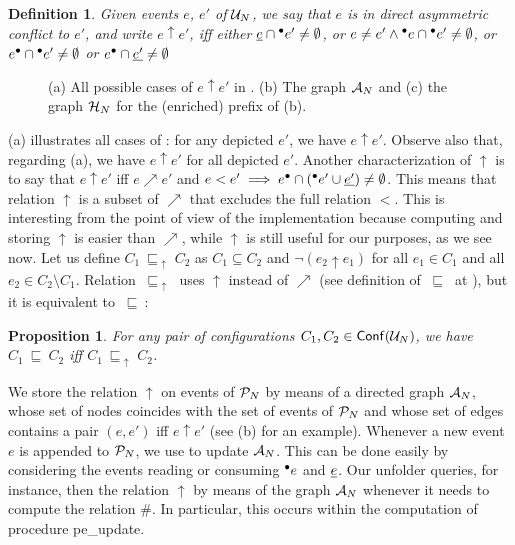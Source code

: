 \documentclass[11pt,a4paper]{article}
\newtheorem{definition}[theorem]{Definition}
\newtheorem{proposition}[theorem]{Proposition}
\newcommand{\conf}[1]{\ensuremath{\mathsf{Conf}(#1)}}
\newcommand{\confl}{\ensuremath{\mathord{\#}}}
\newcommand{\evolves}{{\ensuremath{\ \sqsubseteq \ }}}
\newcommand{\devolves}{\evolves_{\!\!\!\uparrow}\;}
\newcommand{\peupdate}{\mbox{\sf pe\_update}}
\begin{document}
\begin{definition}
\label{def:direct.asymmetric}
Given events $e$, $e'$ of $\mathcal{U}_{N}$, we say that $e$ is in \emph{direct
asymmetric conflict} to $e'$, and write $e \uparrow e'$, iff either
$\underline{e} \cap {}^\bullet e' \ne \emptyset$, or
$e \ne e' \land {}^\bullet e \cap {}^\bullet e' \ne \emptyset$, or
$e^\bullet \cap {}^\bullet e' \ne \emptyset$ or
$e^\bullet \cap \underline{e'} \ne \emptyset$
\end{definition}

\begin{figure}
\caption{(a) All possible cases of $e \uparrow e'$ in .
(b) The graph $\mathcal{A}_{N}$ and (c) the graph $\mathcal{H}_{N}$ for the (enriched) prefix of
 (b).}
\label{fig:the.graph}
\end{figure}

 (a) illustrates all cases of : for any
depicted $e'$, we have $e \uparrow e'$.  Observe also that, regarding
 (a), we have $e \uparrow e'$ for all depicted $e'$.
Another characterization of $\uparrow$ is to say that $e \uparrow e'$ iff $e
\nearrow e'$ and $e < e' \implies e^\bullet \cap ({}^\bullet e' \cup \underline{e'}) \ne
\emptyset$.  This means that relation $\uparrow$ is a subset of $\nearrow$ that
excludes the full relation $<$.  This is interesting from the point of view of
the implementation because computing and storing $\uparrow$ is easier than
$\nearrow$, while $\uparrow$ is still useful for our purposes, as we see now.
Let us define $C_1 \devolves C_2$ as $C_1 \subseteq C_2$ and $\lnot (e_2
\uparrow e_1)$ for all $e_1 \in C_1$ and all $e_2 \in C_2 \setminus C_1$.
Relation $\devolves$ uses $\uparrow$ instead of $\nearrow$ (see definition of
$\evolves$ at ), but it is equivalent to $\evolves$:

\begin{proposition}
For any pair of configurations $C_1, C_2 \in \conf{\unf N}$, we have $C_1
\evolves C_2$ iff $C_1 \devolves C_2$.
\end{proposition}

We store the relation $\uparrow$ on events of $\mathcal{P}_{N}$ by means of a directed
graph $\mathcal{A}_{N}$, whose set of nodes coincides with the set of events of $\mathcal{P}_{N}$ and whose set of edges contains a pair $(e, e')$ iff $e \uparrow e'$ (see
 (b) for an example).  Whenever a new event $e$ is appended to
$\mathcal{P}_{N}$, we use  to update $\mathcal{A}_{N}$.  This can be
done easily by considering the events reading or consuming ${}^\bullet e$ and $\underline{e}$.  Our unfolder queries, for instance, then the relation $\uparrow$ by means
of the graph $\mathcal{A}_{N}$ whenever it needs to compute the relation $\confl$.  In
particular, this occurs within the computation of procedure \peupdate{}.
\end{document}
